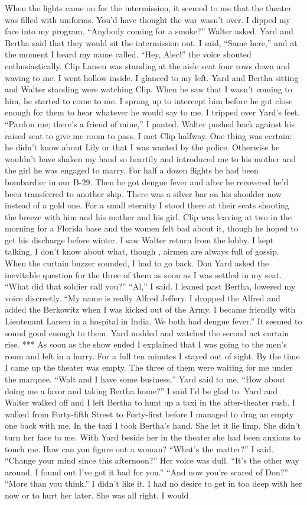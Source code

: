 \documentclass{novel}
\begin{document}
When the lights came on for the intermission, it seemed to me that the theater was filled with uniforms. You’d have thought the war wasn’t over. I dipped my face into my program. “Anybody coming for a smoke?” Walter asked. Yard and Bertha said that they would sit the intermission out. I said, “Same here,” and at the moment I heard my name called. “Hey, Alec!” the voice shouted enthusiastically. Clip Larsen was standing at the aisle seat four rows down and waving to me. I went hollow inside. I glanced to my left. Yard and Bertha sitting and Walter standing were watching Clip. When he saw that I wasn’t coming to him, he started to come to me. I sprang up to intercept him before he got close enough for them to hear whatever he would say to me. I tripped over Yard’s feet. “Pardon me; there’s a friend of mine,” I panted. Walter pushed back against his raised seat to give me room to pass. I met Clip halfway. One thing was certain: he didn’t know about Lily or that I was wanted by the police. Otherwise he wouldn’t have shaken my hand so heartily and introduced me to his mother and the girl he was engaged to marry. For half a dozen flights he had been bombardier in our B-29. Then he got dengue fever and after he recovered he’d been transferred to another ship. There was a silver bar on his shoulder now instead of a gold one. For a small eternity I stood there at their seats shooting the breeze with him and his mother and his girl. Clip was leaving at two in the morning for a Florida base and the women felt bad about it, though he hoped to get his discharge before winter. I saw Walter return from the lobby. I kept talking, I don’t know about what, though , airmen are always full of gossip. When the curtain buzzer sounded, I had to go back. Don Yard asked the inevitable question for the three of them as soon as I was settled in my seat. “What did that soldier call you?” “Al,” I said. I leaned past Bertha, lowered my voice discreetly. “My name is really Alfred Jeffery. I dropped the Alfred and added the Berkowitz when I was kicked out of the Army. I became friendly with Lieutenant Larsen in a hospital in India. We both had dengue fever.” It seemed to sound good enough to them. Yard nodded and watched the second act curtain rise. *** As soon as the show ended I explained that I was going to the men’s room and left in a hurry. For a full ten minutes I stayed out of sight. By the time I came up the theater was empty. The three of them were waiting for me under the marquee. “Walt and I have some business,” Yard said to me. “How about doing me a favor and taking Bertha home?” I said I’d be glad to. Yard and Walter walked off and I left Bertha to hunt up a taxi in the after-theater rush. I walked from Forty-fifth Street to Forty-first before I managed to drag an empty one back with me. In the taxi I took Bertha’s hand. She let it lie limp. She didn’t turn her face to me. With Yard beside her in the theater she had been anxious to touch me. How can you figure out a woman? “What’s the matter?” I said. “Change your mind since this afternoon?” Her voice was dull. “It’s the other way around. I found out I’ve got it bad for you.” “And now you’re scared of Don?” “More than you think.” I didn’t like it. I had no desire to get in too deep with her now or to hurt her later. She was all right. I would 
\end{document}

